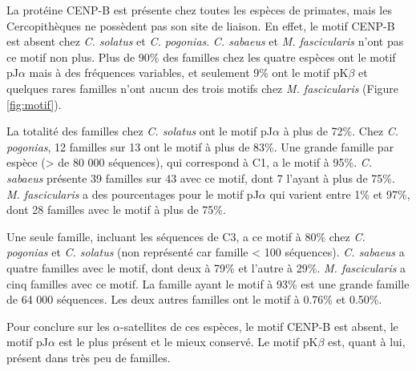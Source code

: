 \documentclass[12pt,a4paper]{article}
\begin{document}
			La protéine CENP-B est présente chez toutes les espèces de primates, mais les Cercopithèques ne possèdent pas son site de liaison. En effet, le motif CENP-B est absent chez \textit{C. solatus} et \textit{C. pogonias}. \textit{C. sabaeus} et \textit{M. fascicularis} n'ont pas ce motif non plus. Plus de 90\% des familles chez les quatre espèces ont le motif pJ$\alpha$ mais à des fréquences variables, et seulement 9\% ont le motif pK$\beta$ et quelques rares familles n'ont aucun des trois motifs chez \textit{M. fascicularis} (Figure \ref{fig:motif}). 
			
		La totalité des familles chez \textit{C. solatus} ont le motif  pJ$\alpha$ à plus de 72\%. Chez \textit{C. pogonias}, 12 familles sur 13 ont le motif à plus de 83\%. Une grande famille par espèce (> de 80 000 séquences), qui correspond à C1, a le motif à 95\%. \textit{C. sabaeus} présente 39 familles sur 43 avec ce motif, dont 7 l'ayant à plus de 75\%. \textit{M. fascicularis} a des pourcentages pour le motif pJ$\alpha$ qui varient entre 1\% et 97\%, dont 28 familles avec le motif à plus de 75\%.
		
			Une seule famille, incluant les séquences de C3, a ce motif à 80\% chez \textit{C. pogonias} et \textit{C. solatus} (non représenté car famille < 100 séquences). \textit{C. sabaeus} a quatre familles avec le motif, dont deux à 79\% et l'autre à 29\%. \textit{M. fascicularis} a cinq familles avec ce motif. La famille ayant le motif à 93\% est une grande famille de 64 000 séquences. Les deux autres familles ont le motif à 0.76\% et 0.50\%.
			
			Pour conclure sur les $\alpha$-satellites de ces espèces, le motif CENP-B est absent, le motif pJ$\alpha$ est le plus présent et le mieux conservé. Le motif pK$\beta$ est, quant à lui, présent dans très peu de familles.
				
\end{document}
